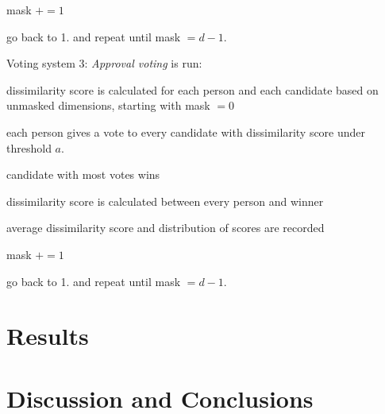 \begin{enum_tight}
\begin{enum_tight}
    \item mask $+= 1$
    \item go back to 1. and repeat until mask $= d-1$.
    \end{enum_tight}
\item Voting system 3: {\it Approval voting} is run:
    \begin{enum_tight}
    \item dissimilarity score is calculated for each person and each candidate based on unmasked dimensions, starting with mask $=0$
    \item each person gives a vote to every candidate with dissimilarity score under threshold $a$.
    \item candidate with most votes wins
    \item dissimilarity score is calculated between every person and winner
    \item average dissimilarity score and distribution of scores are recorded
    \item mask $+= 1$
    \item go back to 1. and repeat until mask $= d-1$.
    \end{enum_tight}
\end{enum_tight}






\section{Results}
\label{sec:results}


\section{Discussion and Conclusions}
\label{sec:conclusion}
